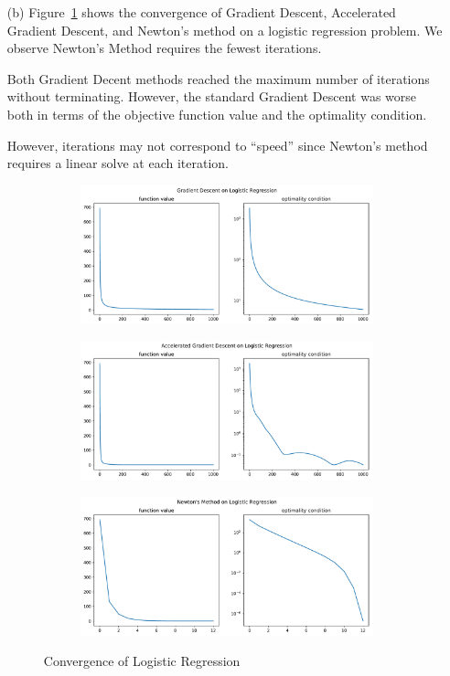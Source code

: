 \documentclass[10pt]{article}
\begin{document}
\begin{solution}[Solution]
\begin{enumerate}[label=(\alph*)]
    \item[(b)] Figure~\ref{lr} shows the convergence of Gradient Descent, Accelerated Gradient Descent, and Newton's method on a logistic regression problem. We observe Newton's Method requires the fewest iterations.
        
        Both Gradient Decent methods reached the maximum number of iterations without terminating. However, the standard Gradient Descent was worse both in terms of the objective function value and the optimality condition.

        However, iterations may not correspond to ``speed'' since Newton's method requires a linear solve at each iteration.
        \begin{figure}[ht] \centering
            \begin{subfigure}{.9\textwidth}\centering
                \includegraphics[width=.7\textwidth]{img/lr_gd.pdf}
            \end{subfigure}
            \begin{subfigure}{.9\textwidth}\centering
                \includegraphics[width=.7\textwidth]{img/lr_agd.pdf}
            \end{subfigure}
            \begin{subfigure}{.9\textwidth}\centering
                \includegraphics[width=.7\textwidth]{img/lr_nm.pdf}
            \end{subfigure}
            \caption{Convergence of Logistic Regression}
            \label{lr}
        \end{figure}
        

\end{enumerate}
\end{solution}
\end{document}
